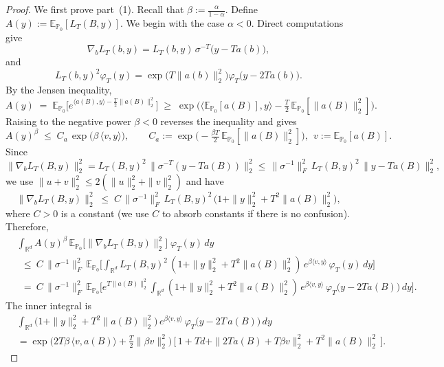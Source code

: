 \documentclass[11pt]{article}
\theoremstyle{definition}
\newcommand{\R}{\mathbb{R}}
\newcommand{\E}{\mathbb{E}}
\begin{document}
\begin{proof}
We first prove part~(1). Recall that $\beta:=\frac{\alpha}{1-\alpha}.$
Define $A(y):=\E_{\mathbb P_0}[L_T(B,y)].$
We begin with the case $\alpha<0$.
Direct computations give
\[
\nabla_b L_T(b,y)
=
L_T(b,y)\,\sigma^{-T}\!\bigl(y-Ta(b)\bigr),
\]
and
\[
L_T(b,y)^2\varphi_T(y)
=
\exp\!\bigl(T\|a(b)\|_2^2\bigr)
\varphi_T\!\bigl(y-2Ta(b)\bigr).
\]
By the Jensen inequality,
\[
A(y) \;=\; \E_{\mathbb{P}_0}\big[e^{\langle a(B),y\rangle-\frac{T}{2}\|a(B)\|_2^2}\big]
\;\ge\;
\exp\!\Big( \langle \E_{\mathbb{P}_0}[a(B)],y\rangle - \tfrac{T}{2}\,\E_{\mathbb{P}_0}\left[\|a(B)\|_2^2\right] \Big).
\]
Raising to the negative power $\beta<0$ reverses the inequality and gives
\begin{equation}\label{eq:est_A_beta}
A(y)^{\beta}\;\le\;C_a\,\exp\!\big(\beta\,\langle v,y\rangle\big),
\qquad
C_a:=\exp\!\Big(-\tfrac{\beta T}{2}\,\E_{\mathbb{P}_0}\left[\|a(B)\|_2^2\right]\Big),\ \ 
v:=\E_{\mathbb{P}_0}[a(B)].
\end{equation}
Since
\[
\|\nabla_b L_T(B,y)\|_2^2
= L_T(B,y)^2\,\|\sigma^{-T}(y-T a(B))\|_{2}^2
\le \,\|\sigma^{-1}\|_F^2\,L_T(B,y)^2\,\|y-T a(B)\|_2^2,
\] 
we use $\|u+v\|_2^2\le 2(\|u\|_2^2+\|v\|_2^2)$ and have %
\begin{equation*}
\|\nabla_b L_T(B,y)\|_2^2
\;\le\; C\,\|\sigma^{-1}\|_F^2\,L_T(B,y)^2\,\big(1+\|y\|_2^2+T^2\|a(B)\|_2^2\big),
\end{equation*}where $C > 0$ is a constant (we use $C$ to absorb constants if there is no confusion). Therefore,
\[
\begin{aligned}
&\int_{\R^d} A(y)^{\beta}\,\E_{\mathbb{P}_0}\big[\|\nabla_b L_T(B,y)\|_2^2\big]\;\varphi_T(y)\,dy \\
&\ \ \le\ C\,\|\sigma^{-1}\|_F^2\,\E_{\mathbb{P}_0}\!\Big[\int_{\R^d} L_T(B,y)^2\,(1+\|y\|_2^2+T^2\|a(B)\|_2^2)\,e^{\beta\langle v,y\rangle}\,\varphi_T(y)\,dy\Big]\\
&\ \ =\ C\,\|\sigma^{-1}\|_F^2\,\E_{\mathbb{P}_0}\!\Big[e^{T\|a(B)\|_2^2}
\int_{\R^d} (1+\|y\|_2^2+T^2\|a(B)\|_2^2)\,e^{\beta\langle v,y\rangle}\,\varphi_T\!\big(y-2T a(B)\big)\,dy\Big].
\end{aligned}
\]
The inner integral is 
\begin{align*}
    &\int_{\mathbb{R}^d} \bigl(1+\|y\|_2^{2}+T^{2}\|a(B)\|_2^{2}\bigr)\,
e^{\beta\langle v,y\rangle}\,
\varphi_{T}\bigl(y-2T\,a(B)\bigr)\,dy\\
&=
\exp\!\Big(2T\beta\,\langle v,a(B)\rangle + \tfrac{T}{2}\|\beta v\|_2^{2}\Big)\,
\Big[\,1 + T d + \|2T a(B) + T\beta v\|_2^{2} + T^{2}\|a(B)\|_2^{2}\,\Big].

\end{align*}
\end{proof}
\end{document}
